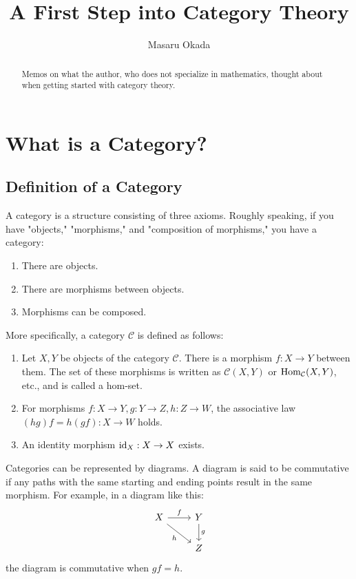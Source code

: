 \documentclass[uplatex,a4j,12pt,dvipdfmx]{jsarticle}
\title{
A First Step into Category Theory
}
\author{
Masaru Okada
}
\begin{document}
\maketitle

\begin{abstract}
Memos on what the author, who does not specialize in mathematics, thought about when getting started with category theory.
\end{abstract}

\section{What is a Category?}

\subsection{Definition of a Category}

A category is a structure consisting of three axioms. Roughly speaking, if you have "objects," "morphisms," and "composition of morphisms," you have a category:

\begin{enumerate}
    \item There are objects.
    \item There are morphisms between objects.
    \item Morphisms can be composed.
\end{enumerate}

More specifically, a category ${\mathcal C}$ is defined as follows:

\begin{enumerate}
    \item Let $X,Y$ be objects of the category ${\mathcal C}$. There is a morphism $f: X \to Y$ between them.
    The set of these morphisms is written as ${\mathcal C}(X,Y)$ or ${\rm Hom}_{\mathcal C}(X,Y)$, etc., and is called a hom-set.
    \item For morphisms $f: X \to Y, g: Y \to Z, h: Z \to W$, the associative law $(hg)f = h(gf): X \to W$ holds.
    \item An identity morphism ${\rm id}_{X}: X \to X$ exists.
\end{enumerate}

Categories can be represented by diagrams.
A diagram is said to be commutative if any paths with the same starting and ending points result in the same morphism.
For example, in a diagram like this:
\[
\begin{tikzcd}
X \arrow[r,"f"]\arrow[rd,"h"'] & Y \arrow[d,"g"]\\
& Z
\end{tikzcd}
\]
the diagram is commutative when $gf=h$.
\end{document}
